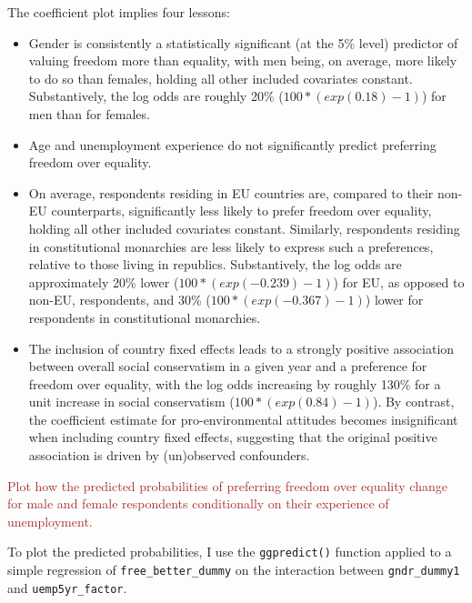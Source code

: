 \documentclass[
]{article}
\begin{document}
The coefficient plot implies four lessons:

\begin{itemize}
\item
  Gender is consistently a statistically significant (at the 5\% level)
  predictor of valuing freedom more than equality, with men being, on
  average, more likely to do so than females, holding all other included
  covariates constant. Substantively, the log odds are roughly 20\%
  (\(100*(exp(0.18)-1)\)) for men than for females.
\item
  Age and unemployment experience do not significantly predict
  preferring freedom over equality.
\item
  On average, respondents residing in EU countries are, compared to
  their non-EU counterparts, significantly less likely to prefer freedom
  over equality, holding all other included covariates constant.
  Similarly, respondents residing in constitutional monarchies are less
  likely to express such a preferences, relative to those living in
  republics. Substantively, the log odds are approximately 20\% lower
  (\(100*(exp(-0.239)-1)\)) for EU, as opposed to non-EU, respondents,
  and 30\% (\(100*(exp(-0.367)-1)\)) lower for respondents in
  constitutional monarchies.
\item
  The inclusion of country fixed effects leads to a strongly positive
  association between overall social conservatism in a given year and a
  preference for freedom over equality, with the log odds increasing by
  roughly 130\% for a unit increase in social conservatism
  (\(100*(exp(0.84)-1)\)). By contrast, the coefficient estimate for
  pro-environmental attitudes becomes insignificant when including
  country fixed effects, suggesting that the original positive
  association is driven by (un)observed confounders.
\end{itemize}

\textcolor{brown}{Plot how the predicted probabilities of preferring freedom over equality change for male and female respondents conditionally on their experience of unemployment.}

To plot the predicted probabilities, I use the \texttt{ggpredict()}
function applied to a simple regression of \texttt{free\_better\_dummy}
on the interaction between \texttt{gndr\_dummy1} and
\texttt{uemp5yr\_factor}.
\end{document}
